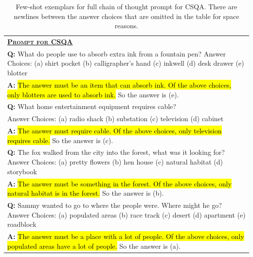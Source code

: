 \documentclass[]{article}
\theoremstyle{plain}
\theoremstyle{definition}
\theoremstyle{remark}
\begin{document}
\begin{table}[H]
    \caption{    
    Few-shot exemplars for full chain of thought prompt for CSQA. There are newlines between the answer choices that are omitted in the table for space reasons.
    }
    \centering
    \small
    \begin{tabular}{p{\linewidth}}
        \toprule
        \underline{\textbf{\textsc{Prompt for CSQA}}} \\
        \vspace{-2mm}
        \textbf{Q:} What do people use to absorb extra ink from a fountain pen? Answer Choices: (a) shirt pocket (b) calligrapher's hand (c) inkwell (d) desk drawer (e) blotter \\
        \vspace{-1mm}
        \textbf{A:} \hl{The answer must be an item that can absorb ink. Of the above choices, only blotters are used to absorb ink.} So the answer is (e). \\
        \vspace{0mm}
        \textbf{Q:} What home entertainment equipment requires cable? \\
        Answer Choices: (a) radio shack (b) substation (c) television (d) cabinet \\
        \vspace{-1mm}
        \textbf{A:} \hl{The answer must require cable. Of the above choices, only television requires cable.} So the answer is (c). \\
        \vspace{0mm}
        \textbf{Q:} The fox walked from the city into the forest, what was it looking for? Answer Choices: (a) pretty flowers (b) hen house (c) natural habitat (d) storybook\\
        \vspace{-1mm}
        \textbf{A:} \hl{The answer must be something in the forest. Of the above choices, only natural habitat is in the forest.}  So the answer is (b). \\
        \vspace{0mm}
        \textbf{Q:} Sammy wanted to go to where the people were. Where might he go? Answer Choices: (a) populated areas (b) race track (c) desert (d) apartment (e) roadblock \\
        \vspace{-1mm}
        \textbf{A:} \hl{The answer must be a place with a lot of people. Of the above choices, only populated areas have a lot of people.} So the answer is (a). \\

\end{tabular}
\end{table}
\end{document}
